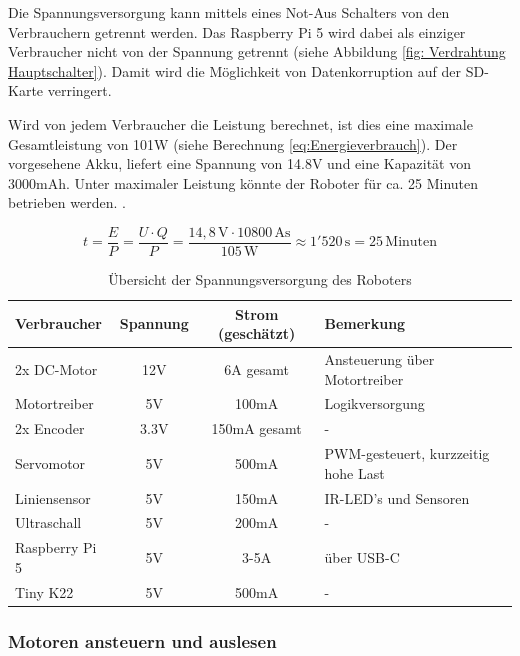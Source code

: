 Die Spannungsversorgung kann mittels eines Not-Aus Schalters von den Verbrauchern getrennt werden. Das Raspberry Pi 5 wird dabei als einziger Verbraucher nicht von der Spannung getrennt (siehe Abbildung \ref{fig: Verdrahtung Hauptschalter}). Damit wird die Möglichkeit von Datenkorruption auf der SD-Karte verringert.

Wird von jedem Verbraucher die Leistung berechnet, ist dies eine maximale Gesamtleistung von 101W (siehe Berechnung \ref{eq:Energieverbrauch}). Der vorgesehene Akku, liefert eine Spannung von 14.8V und eine Kapazität von 3000mAh. Unter maximaler Leistung könnte der Roboter für ca. 25 Minuten betrieben werden. .

\begin{equation}
    t = \frac{E}{P} = \frac{U \cdot Q}{P} = \frac{14{,}8\,\text{V} \cdot 10800\,\text{As}}{105\,\text{W}} \approx 1{'}520\,\text{s} = 25\,\text{Minuten} 
    \label{eq:Energieverbrauch}
\end{equation}


\newpage

\begin{table}[H]
\centering
\renewcommand{\arraystretch}{1.3}
\begin{tabularx}{\textwidth}{|l|c|c|X|}
\hline
\textbf{Verbraucher} & \textbf{Spannung} & \textbf{Strom (geschätzt)} & \textbf{Bemerkung} \\
\hline
2x DC-Motor & 12V & 6A gesamt & Ansteuerung über Motortreiber \\
\hline
Motortreiber & 5V &  100mA & Logikversorgung \\
\hline
2x Encoder & 3.3V &  150mA gesamt &- \\
\hline
Servomotor & 5V &  500mA & PWM-gesteuert, kurzzeitig hohe Last \\
\hline
Liniensensor & 5V &  150mA & IR-LED's und Sensoren \\
\hline
Ultraschall & 5V &  200mA &- \\
\hline
Raspberry Pi 5 & 5V & 3-5A & über USB-C \\
\hline
Tiny K22 & 5V & 500mA & - \\
\hline
\end{tabularx}
\caption{Übersicht der Spannungsversorgung des Roboters}
\label{tab:spannungsversorgung}
\end{table}





\subsubsection{Motoren ansteuern und auslesen}
\label{motoren-encoder}

